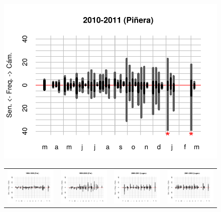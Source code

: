 \documentclass[letter,12pt]{article}
\begin{document}

\begin{figure}
\begin{center}
 \includegraphics[width=.65\columnwidth]{../graphs/urgenciasHistog2010.pdf}
\begin{tabular}{cccc}
    \includegraphics[width=.22\columnwidth]{../graphs/urgenciasHistog1998.pdf} &
    \includegraphics[width=.22\columnwidth]{../graphs/urgenciasHistog1999.pdf} &
    \includegraphics[width=.22\columnwidth]{../graphs/urgenciasHistog2000.pdf} &
    \includegraphics[width=.22\columnwidth]{../graphs/urgenciasHistog2001.pdf} \\

\end{tabular}
\end{center}
\end{figure}
\end{document}
